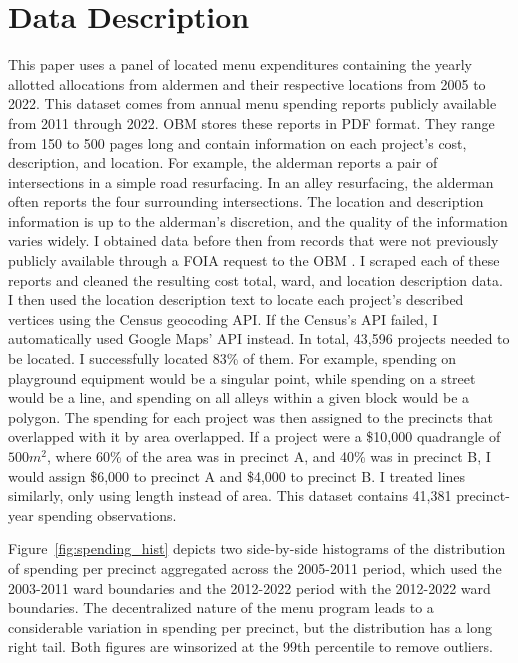 \section{Data Description}\label{sec:data_description}
This paper uses a panel of located menu expenditures containing the yearly allotted allocations
from aldermen and their respective locations from 2005 to 2022. 
This dataset comes from annual menu spending reports publicly available from 2011 through 2022. 
OBM stores these reports in PDF format.
They range from 150 to 500 pages long and contain information on each project's cost, description, and location. 
For example, the alderman reports a pair of intersections in a simple road resurfacing. 
In an alley resurfacing, the alderman often reports the four surrounding intersections.
The location and description information is up to the alderman's discretion, and the quality of
the information varies widely. 
I obtained data before then from records that were not previously publicly available through a FOIA request to the OBM \citep{OBM_datasource}.  
I scraped each of these reports and cleaned the resulting cost total, ward, and location description data.
I then used the location description text to locate each project's described vertices using the Census geocoding API.
If the Census's API failed, I automatically used Google Maps' API instead.
In total, 43,596 projects needed to be located.  
I successfully located 83\% of them.
For example, spending on playground equipment would be a singular point, while spending on a street would be a line, and spending on all alleys within a given block would be a polygon.
The spending for each project was then assigned to the precincts that overlapped with it by area overlapped.
If a project were a \$10,000 quadrangle of $500 m^2$, where 60\% of the area was in precinct A, and 40\% was in precinct B, I would assign \$6,000 to precinct A and \$4,000 to precinct B.
I treated lines similarly, only using length instead of area.
This dataset contains 41,381 precinct-year spending observations.

Figure~\ref{fig:spending_hist} depicts two side-by-side histograms of the distribution of spending per precinct aggregated across the 2005-2011 period, which used the 2003-2011 ward boundaries and the 2012-2022 period with the 2012-2022 ward boundaries.
The decentralized nature of the menu program leads to a considerable variation in spending per precinct, but the distribution has a long right tail.
Both figures are winsorized at the 99th percentile to remove outliers.

